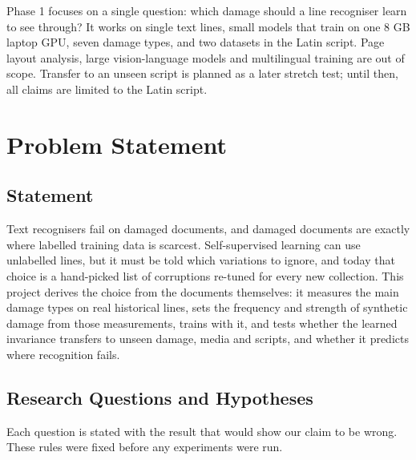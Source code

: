 \documentclass[
  12pt,
  a4paper,
]{report}
\begin{document}
Phase 1 focuses on a single question: which damage should a line
recogniser learn to see through? It works on single text lines, small
models that train on one 8 GB laptop GPU, seven damage types, and two
datasets in the Latin script. Page layout analysis, large
vision-language models and multilingual training are out of scope.
Transfer to an unseen script is planned as a later stretch test; until
then, all claims are limited to the Latin script.

\chapter{Problem Statement}\label{problem-statement}

\section{Statement}\label{statement}

Text recognisers fail on damaged documents, and damaged documents are
exactly where labelled training data is scarcest. Self-supervised
learning can use unlabelled lines, but it must be told which variations
to ignore, and today that choice is a hand-picked list of corruptions
re-tuned for every new collection. This project derives the choice from
the documents themselves: it measures the main damage types on real
historical lines, sets the frequency and strength of synthetic damage
from those measurements, trains with it, and tests whether the learned
invariance transfers to unseen damage, media and scripts, and whether it
predicts where recognition fails.

\section{Research Questions and
Hypotheses}\label{research-questions-and-hypotheses}

Each question is stated with the result that would show our claim to be
wrong. These rules were fixed before any experiments were run.
\end{document}
